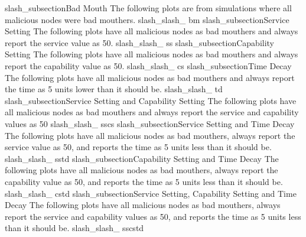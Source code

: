 slash_subsection{Bad Mouth}
The following plots are from simulations where all malicious nodes were
bad mouthers.
slash_slash_
bm
slash_subsection{Service Setting}
The following plots have all malicious nodes as bad mouthers and always
report the service value as 50.
slash_slash_
ss
slash_subsection{Capability Setting}
The following plots have all malicious nodes as bad mouthers and always
report the capability value as 50.
slash_slash_
cs
slash_subsection{Time Decay}
The following plots have all malicious nodes as bad mouthers and always
report the time as 5 units lower than it should be.
slash_slash_
td
slash_subsection{Service Setting and Capability Setting}
The following plots have all malicious nodes as bad mouthers and always
report the service and capability values as 50
slash_slash_
sscs
slash_subsection{Service Setting and Time Decay}
The following plots have all malicious nodes as bad mouthers, always
report the service value as 50, and reports the time as 5 units less than
it should be.
slash_slash_
sstd
slash_subsection{Capability Setting and Time Decay}
The following plots have all malicious nodes as bad mouthers, always
report the capability value as 50, and reports the time as 5 units less than
it should be.
slash_slash_
cstd
slash_subsection{Service Setting, Capability Setting and Time Decay}
The following plots have all malicious nodes as bad mouthers, always
report the service and capability values as 50, and reports the time as
5 units less than it should be.
slash_slash_
sscstd
